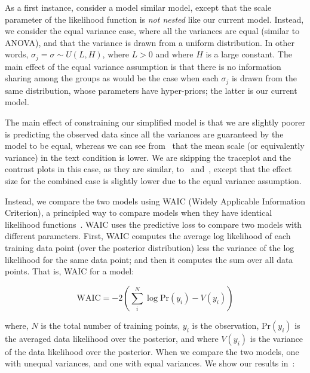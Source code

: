 As a first instance, consider a model similar model, except that the scale parameter of the likelihood function is \textit{not nested} like our current model. Instead, we consider the equal variance case, where all the variances are equal (similar to ANOVA), and that the variance is drawn from a uniform distribution. In other words, $\sigma_j = \sigma \sim U(L, H)$, where $L>0$ and where $H$ is a large constant. The main effect of the equal variance assumption is that there is no information sharing among the groups as would be the case when each $\sigma_j$ is drawn from the same distribution, whose parameters have hyper-priors; the latter is our current model.

The main effect of constraining our simplified model is that we are slightly poorer is predicting the observed data since all the variances are guaranteed by the model to be equal, whereas we can see from~ that the mean scale (or equivalently variance) in the text condition is lower. We are skipping the traceplot and the contrast plots in this case, as they are similar, to~ and~, except that the effect size for the combined case is slightly lower due to the equal variance assumption. 

Instead, we compare the two models using WAIC (Widely Applicable Information Criterion), a principled way to compare models when they have identical likelihood functions~\parencite{Gelman2014a}. WAIC uses the predictive loss to compare two models with different parameters. First, WAIC computes the average log likelihood of each training data point (over the posterior distribution) less the variance of the log likelihood for the same data point; and then it computes the sum over all data points. That is, WAIC for a model: 

\begin{equation*}
    \mathrm{WAIC} = -2 \left (\sum_i^N \log \mathrm{Pr}(y_i) - V(y_i) \right) 
\end{equation*}

where, $N$ is the total number of training points, $y_i$ is the observation, $\mathrm{Pr}(y_i)$ is the averaged data likelihood over the posterior, and where $V(y_i)$ is the variance of the data likelihood over the posterior. When we compare the two models, one with unequal variances, and one with equal variances. We show our results in~:


